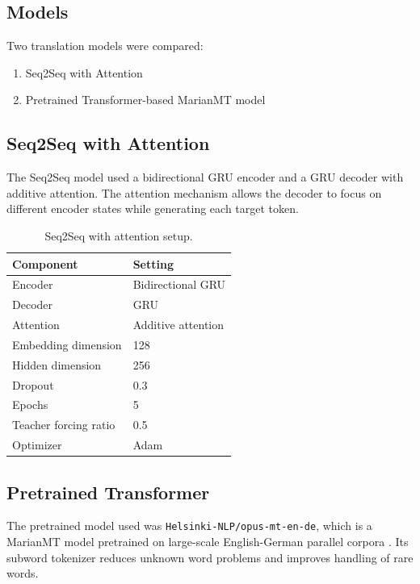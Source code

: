 \documentclass[11pt,a4paper]{article}
\begin{document}
\subsection{Models}

Two translation models were compared:

\begin{enumerate}[leftmargin=*]
    \item Seq2Seq with Attention
    \item Pretrained Transformer-based MarianMT model
\end{enumerate}

\subsection{Seq2Seq with Attention}

The Seq2Seq model used a bidirectional GRU encoder and a GRU decoder with additive attention. The attention mechanism allows the decoder to focus on different encoder states while generating each target token.

\begin{table}[H]
\centering
\caption{Seq2Seq with attention setup.}
\begin{tabular}{ll}
\toprule
Component & Setting \\
\midrule
Encoder & Bidirectional GRU \\
Decoder & GRU \\
Attention & Additive attention \\
Embedding dimension & 128 \\
Hidden dimension & 256 \\
Dropout & 0.3 \\
Epochs & 5 \\
Teacher forcing ratio & 0.5 \\
Optimizer & Adam \\
\bottomrule
\end{tabular}
\end{table}

\subsection{Pretrained Transformer}

The pretrained model used was \texttt{Helsinki-NLP/opus-mt-en-de}, which is a MarianMT model pretrained on large-scale English-German parallel corpora \cite{junczys2018marian}. Its subword tokenizer reduces unknown word problems and improves handling of rare words.
\end{document}
